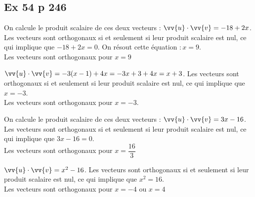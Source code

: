 \documentclass[12pt,a4paper]{book}
\begin{document}
\subsection*{Ex 54 p 246}
\begin{enumMet}
    \item On calcule le produit scalaire de ces deux vecteurs : $ \vv{u} \cdot  \vv{v}=-18+2 x$. Les vecteurs sont orthogonaux si et seulement si leur produit scalaire est nul, ce qui implique que $-18+2 x=0 .$ On résout cette équation $: x=9$.\\
     Les vecteurs sont orthogonaux pour $x=9$
     \item $ \vv{u} \cdot  \vv{v}=-3(x-1)+4 x=-3 x+3+4 x=x+3$. Les vecteurs sont orthogonaux si et seulement si leur produit scalaire est nul, ce qui implique que $x=-3$.\\
     Les vecteurs sont orthogonaux pour $x=-3$.
     \item On calcule le produit scalaire de ces deux vecteurs : $ \vv{u} \cdot  \vv{v}=3 x-16$. Les vecteurs sont orthogonaux si et seulement si leur produit scalaire est nul, ce qui implique que $3 x-16=0$.\\
     Les vecteurs sont orthogonaux pour $x=\dfrac{16}{3}$
     \item $ \vv{u} \cdot  \vv{v}=x^{2}-16$. Les vecteurs sont orthogonaux si et seulement si leur produit scalaire est nul, ce qui implique que $x^{2}=16$.\\
     Les vecteurs sont orthogonaux pour $x=-4$ ou $x=4$
 \end{enumMet}
\end{document}
